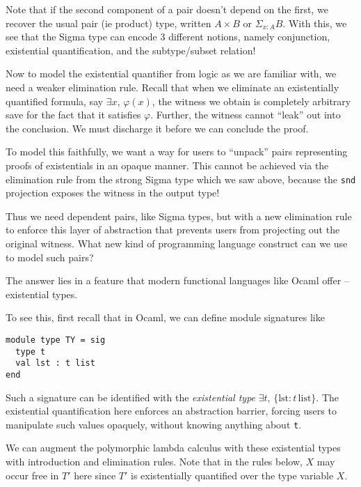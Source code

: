 \documentclass{article}
\begin{document}
Note that if the second component of a pair doesn't depend on the first, we recover
the usual pair (ie product) type, written $A \times B$ or $\Sigma_{x : A} B$.
With this, we see that the Sigma type can encode 3 different notions, namely
conjunction, existential quantification, and the subtype/subset relation!

Now to model the existential quantifier from logic as we are familiar with, we
need a weaker elimination rule.
Recall that when we eliminate an existentially quantified formula, say
$\exists x, \, \varphi(x)$, the witness we obtain is completely arbitrary save
for the fact that it satisfies $\varphi$.
Further, the witness cannot ``leak'' out into the conclusion. We must discharge
it before we can conclude the proof.

To model this faithfully, we want a way for users to ``unpack'' pairs
representing proofs of existentials in an opaque manner.
This cannot be achieved via the elimination rule from the
strong  Sigma type which we saw above, because the \verb|snd| projection
exposes the witness in the output type!

Thus we need dependent pairs, like Sigma types, but with a new elimination rule
to enforce this layer of abstraction that prevents users from projecting out the
original witness. What new kind of programming language construct can we use to
model such pairs?

The answer lies in a feature that modern functional languages like Ocaml offer
-- existential types. 

To see this, first recall that in Ocaml, we can define module signatures like

\begin{verbatim}
module type TY = sig
  type t
  val lst : t list
end
\end{verbatim}

Such a signature can be identified with the \textit{existential type}
$\exists t, \, \{ \text{lst} : t \, \text{list} \}$.
The existential quantification here enforces an abstraction barrier, forcing
users to manipulate such values opaquely, without knowing anything about \verb|t|.

We can augment the polymorphic lambda calculus with these existential types
with introduction and elimination rules.
Note that in the rules below, $X$ may occur free in $T'$ here since $T'$ is
existentially quantified over the type variable $X$.
\end{document}
